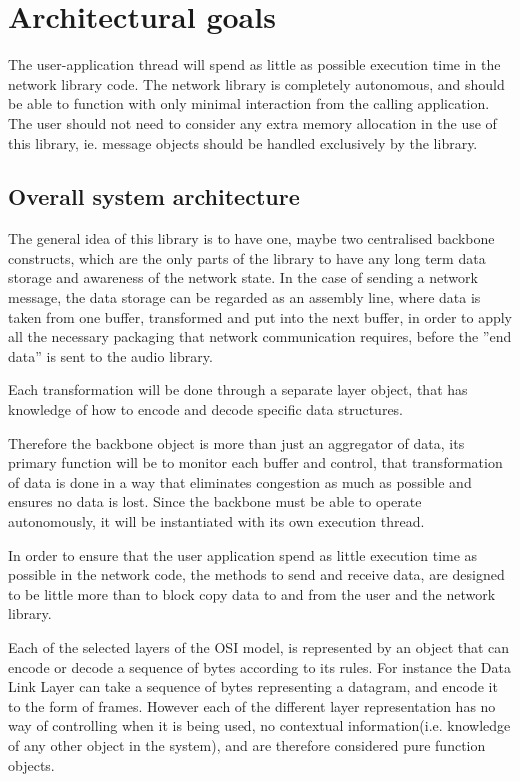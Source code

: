 \section{Architectural goals}

The user-application thread will spend as little as possible execution time in the network library code.
The network library is completely autonomous, and should be able to function with only minimal interaction from the calling application.
The user should not need to consider any extra memory allocation in the use of this library, ie. message objects should be handled exclusively by the library.

\subsection{Overall system architecture}
The general idea of this library is to have one, maybe two centralised backbone constructs, which are the only parts of the library to have any long term data storage and awareness of the network state. In the case of sending a network message, the data storage can be regarded as an assembly line, where data is taken from one buffer, transformed and put into the next buffer, in order to apply all the necessary packaging that network communication requires, before the ''end data'' is sent to the audio library.

Each transformation will be done through a separate layer object, that has knowledge of how to encode and decode specific data structures.

Therefore the backbone object is more than just an aggregator of data, its primary function will be to monitor each buffer and control, that transformation of data is done in a way that eliminates congestion as much as possible and ensures no data is lost. Since the backbone must be able to operate autonomously, it will be instantiated with its own execution thread.

In order to ensure that the user application spend as little execution time as possible in the network code, the methods to send and receive data, are designed to be little more than to block copy data to and from the user and the network library.

Each of the selected layers of the OSI model, is represented by an object that can encode or decode a sequence of bytes according to its rules. For instance the Data Link Layer can take a sequence of bytes representing a datagram, and encode it to the form of frames.
However each of the different layer representation has no way of controlling when it is being used, no contextual information(i.e. knowledge of any other object in the system), and are therefore considered pure function objects.

